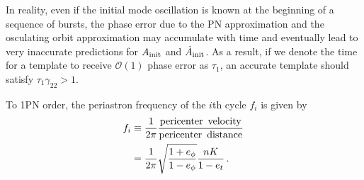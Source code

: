 \documentclass[prd,aps,floatfix,superscriptaddress,nofootinbib,twocolumn,10pt,English]{revtex4}
\begin{document}
In reality, even if the initial mode oscillation is known at the beginning 
of a sequence of bursts, the phase error due to the PN approximation and the 
osculating orbit approximation may accumulate with time and eventually lead 
to very inaccurate predictions for $A_{\rm init}$ and $\dot{A}_{\rm init}$. 
As a result, if we denote the time for a template to receive $\mathcal{O}(1)$
phase error as $\tau_1$, an accurate template should satisfy $\tau_1 \gamma_{22}> 1$.

To 1PN order, the periastron frequency of the $i$th cycle $f_i$ is given by \cite{loutrel2017eccentric}
\begin{align}
f_i  & \equiv \frac{1}{2 \pi} \frac{\rm pericenter \,\,\,velocity}{\rm pericenter \,\,\, distance}\, \nonumber \\
& =\frac{1}{2 \pi} \sqrt{\frac{1+e_\phi}{1-e_\phi}} \frac{n K}{1-e_t}\,.
\end{align}
\end{document}
